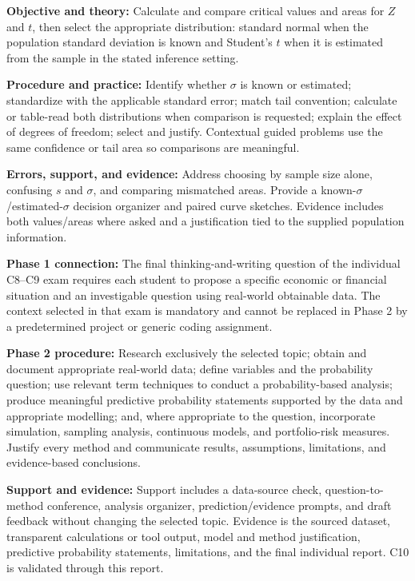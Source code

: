 \documentclass[10pt,letterpaper]{article}
\newcommand{\labelled}[2]{\textbf{#1:} #2\par}
\newcommand{\criterionpart}[1]{\Needspace{10\baselineskip}\par\vspace{4pt}{\bfseries #1\par}}
\begin{document}
	\criterionpart{C9 -- Standard normal versus Student's t}
	\labelled{Objective and theory}{Calculate and compare critical values and areas for $Z$ and $t$, then select the appropriate distribution: standard normal when the population standard deviation is known and Student's $t$ when it is estimated from the sample in the stated inference setting.}
	\labelled{Procedure and practice}{Identify whether $\sigma$ is known or estimated; standardize with the applicable standard error; match tail convention; calculate or table-read both distributions when comparison is requested; explain the effect of degrees of freedom; select and justify. Contextual guided problems use the same confidence or tail area so comparisons are meaningful.}
	\labelled{Errors, support, and evidence}{Address choosing by sample size alone, confusing $s$ and $\sigma$, and comparing mismatched areas. Provide a known-$\sigma$/estimated-$\sigma$ decision organizer and paired curve sketches. Evidence includes both values/areas where asked and a justification tied to the supplied population information.}
	
	\criterionpart{C10 -- Investigation selected in the C8--C9 exam}
	\labelled{Phase 1 connection}{The final thinking-and-writing question of the individual C8--C9 exam requires each student to propose a specific economic or financial situation and an investigable question using real-world obtainable data. The context selected in that exam is mandatory and cannot be replaced in Phase 2 by a predetermined project or generic coding assignment.}
	\labelled{Phase 2 procedure}{Research exclusively the selected topic; obtain and document appropriate real-world data; define variables and the probability question; use relevant term techniques to conduct a probability-based analysis; produce meaningful predictive probability statements supported by the data and appropriate modelling; and, where appropriate to the question, incorporate simulation, sampling analysis, continuous models, and portfolio-risk measures. Justify every method and communicate results, assumptions, limitations, and evidence-based conclusions.}
	\labelled{Support and evidence}{Support includes a data-source check, question-to-method conference, analysis organizer, prediction/evidence prompts, and draft feedback without changing the selected topic. Evidence is the sourced dataset, transparent calculations or tool output, model and method justification, predictive probability statements, limitations, and the final individual report. C10 is validated through this report.}
	
\end{document}
